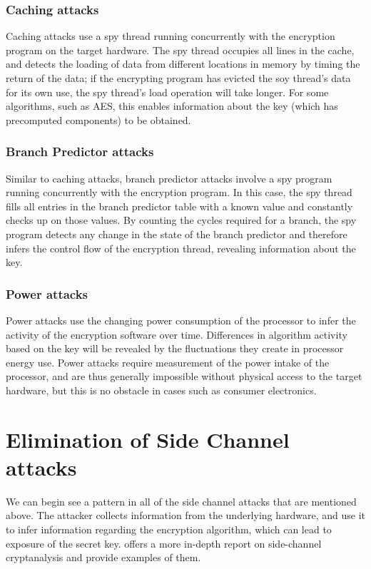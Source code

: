 \documentclass[times, 10pt,twocolumn]{article}
\begin{document}
\subsubsection{Caching attacks}
Caching attacks use a spy thread running concurrently with the encryption program on the target hardware.  The spy thread occupies all lines in the cache, and detects the loading of data from different locations in memory by timing the return of the data; if the encrypting program has evicted the soy thread's data for its own use, the spy thread's load operation will take longer.  For some algorithms, such as AES, this enables information about the key (which has precomputed components) to be obtained.
\subsubsection{Branch Predictor attacks}
Similar to caching attacks, branch predictor attacks involve a spy program running concurrently with the encryption program.  In this case, the spy thread fills all entries in the branch predictor table with a known value and constantly checks up on those values.  By counting the cycles required for a branch, the spy program detects any change in the state of the branch predictor and therefore infers the control flow of the encryption thread, revealing information about the key.
\subsubsection{Power attacks}
Power attacks use the changing power consumption of the processor to infer the activity of the encryption software over time.  Differences in algorithm activity based on the key will be revealed by the fluctuations they create in processor energy use.  Power attacks require measurement of the power intake of the processor, and are thus generally impossible without physical access to the target hardware, but this is no obstacle in cases such as consumer electronics.

\section{Elimination of Side Channel attacks}
We can begin see a pattern in all of the side channel attacks that are mentioned above. The attacker collects information from the underlying hardware, and use it to infer information regarding the encryption algorithm, which can lead to exposure of the secret key. \cite{Kelsey98sidechannel} offers a more in-depth report on side-channel cryptanalysis and provide examples of them. 
\end{document}
